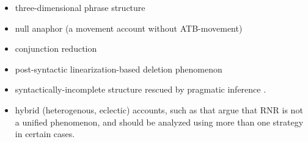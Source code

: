 \documentclass[paper=letter, fontsize=12pt]{scrartcl} %
\numberwithin{equation}{section} %
\numberwithin{figure}{section} %
\numberwithin{table}{section} %
\begin{document}
\begin{itemize}
    \item  three-dimensional phrase structure \citep{Duman:2003}
    \item null anaphor (a movement account without ATB-movement) \citep{Kimura:1986}
    \item conjunction reduction \citep{Velde:2006} 
    \item post-syntactic linearization-based deletion phenomenon \citep{Chaves:2007,Chaves:2014}
    \item syntactically-incomplete structure rescued by pragmatic inference \citep{Larson:2013,Larson:2013a}.
    \item hybrid (heterogenous, eclectic) accounts, such as \citealt{Barros:2010,Barros:2011,Valmala:2013,Chaves:2014} that argue that RNR is not a unified phenomenon, and should be analyzed using more than one strategy in certain cases.
    \end{itemize}






\begin{multicols}{2}
{\footnotesize
}

\end{multicols}
\end{document}
